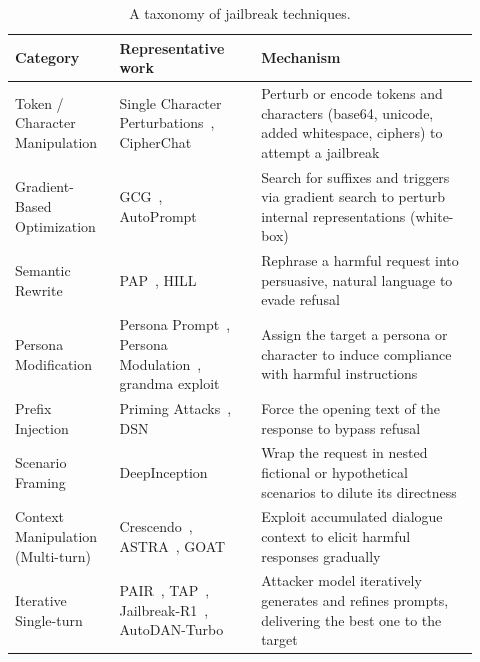 \documentclass[a4paper,fleqn]{cas-sc}
\begin{document}
\begin{table}[htbp]
  \centering
  \caption{A taxonomy of jailbreak techniques.}
  \label{tab:taxonomy}
  \footnotesize
  \begin{tabular}{@{}>{\raggedright\arraybackslash}p{0.20\linewidth}>{\raggedright\arraybackslash}p{0.29\linewidth}p{0.43\linewidth}@{}}
    \toprule
    \textbf{Category}                 & \textbf{Representative work}                                                                  & \textbf{Mechanism}                                                                                          \\
    \midrule
    Token / Character Manipulation    & Single Character Perturbations~\cite{scp}, CipherChat~\cite{cipherchat}                       & Perturb or encode tokens and characters (base64, unicode, added whitespace, ciphers) to attempt a jailbreak \\
    \midrule
    Gradient-Based Optimization       & GCG~\cite{gcg}, AutoPrompt~\cite{autoprompt}                                                  & Search for suffixes and triggers via gradient search to perturb internal representations (white-box)        \\
    \midrule
    Semantic Rewrite                  & PAP~\cite{pap}, HILL~\cite{hill}                                                              & Rephrase a harmful request into persuasive, natural language to evade refusal                               \\
    \midrule
    Persona Modification              & Persona Prompt~\cite{personaprompts}, Persona Modulation~\cite{personamod}, grandma exploit   & Assign the target a persona or character to induce compliance with harmful instructions                     \\
    \midrule
    Prefix Injection                  & Priming Attacks~\cite{priming}, DSN~\cite{dsn}                                                & Force the opening text of the response to bypass refusal                                                    \\
    \midrule
    Scenario Framing                  & DeepInception~\cite{deepinception}                                                            & Wrap the request in nested fictional or hypothetical scenarios to dilute its directness                     \\
    \midrule
    Context Manipulation (Multi-turn) & Crescendo~\cite{crescendo}, ASTRA~\cite{astra}, GOAT~\cite{goat}                              & Exploit accumulated dialogue context to elicit harmful responses gradually                                  \\
    \midrule
    Iterative Single-turn             & PAIR~\cite{pair}, TAP~\cite{tap}, Jailbreak-R1~\cite{jbr1}, AutoDAN-Turbo~\cite{autodanturbo} & Attacker model iteratively generates and refines prompts, delivering the best one to the target             \\
    \bottomrule
  \end{tabular}
\end{table}
\end{document}

